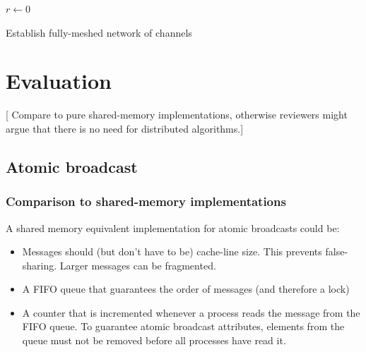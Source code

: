 \documentclass{article}
\newcommand{\stefan}[1]{
  {\color{skRed}[{\color{red}{SK}} #1]}}
\begin{document}
\begin{algorithm}[htb]
  \BlankLine
  \BlankLine
  $r \leftarrow 0$\;
  \caption{Establish fully-meshed network of channels}
  \label{algo:ab_bind}
\end{algorithm}

\section{Evaluation}

\stefan{Compare to pure shared-memory implementations, otherwise
  reviewers might argue that there is no need for distributed
  algorithms.}

\subsection{Atomic broadcast}



\subsubsection{Comparison to shared-memory implementations}

A shared memory equivalent implementation for atomic broadcasts could
be:
\begin{itemize}
\item Messages should (but don't have to be) cache-line size. This
  prevents false-sharing. Larger messages can be fragmented. 
\item A FIFO queue that guarantees the order of messages (and therefore
  a lock)
\item A counter that is incremented whenever a process reads the
  message from the FIFO queue. To guarantee atomic broadcast
  attributes, elements from the queue must not be removed before all
  processes have read it.
\end{itemize}
\end{document}

